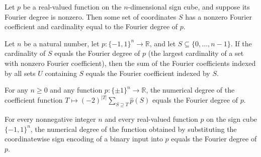 \begin{theorem}
\label{FABL.exists_top_fourierCoeff}
\leanok
{}
Let $p$ be a real-valued function on the $n$-dimensional sign cube, and suppose its
Fourier degree is nonzero. Then some set of coordinates $S$ has a nonzero Fourier
coefficient and cardinality equal to the Fourier degree of $p$.
\end{theorem}

\begin{theorem}
\label{FABL.sum_fourierCoeff_supersets_eq_self_of_card_eq_degree}
\leanok
{}
Let $n$ be a natural number, let $p:\{-1,1\}^n\to\mathbb R$, and let
$S\subseteq\{0,\ldots,n-1\}$. If the cardinality of $S$ equals the Fourier degree of $p$
(the largest cardinality of a set with nonzero Fourier coefficient), then the sum of the
Fourier coefficients indexed by all sets $U$ containing $S$ equals the Fourier
coefficient indexed by $S$.
\end{theorem}

\begin{theorem}
\label{FABL.numericalDegree_fourierSubstitutionCoeff}
\leanok
{}
For any $n\ge 0$ and any function $p:\{\pm1\}^n\to\mathbb{R}$, the numerical degree of
the coefficient function $T\mapsto(-2)^{|T|}\sum_{S\supseteq T}\widehat p(S)$ equals the
Fourier degree of $p$.
\end{theorem}

\begin{theorem}
\label{FABL.functionNumericalDegree_fourierSubstitution}
\leanok
{}
For every nonnegative integer $n$ and every real-valued function $p$ on the sign cube
$\{ -1,1\}^n$, the numerical degree of the function obtained by substituting the
coordinatewise sign encoding of a binary input into $p$ equals the Fourier degree of
$p$.
\end{theorem}

